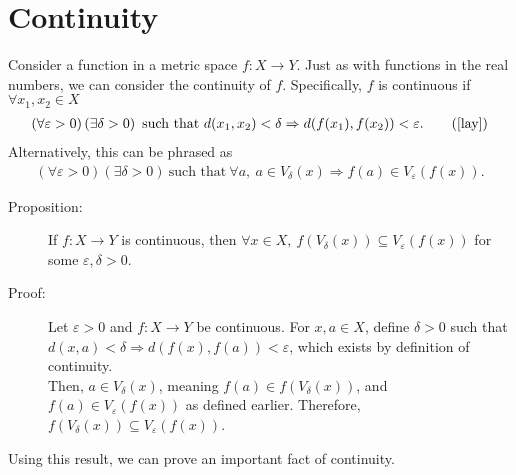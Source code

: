 \documentclass[12pt]{extarticle}
\begin{document}
  \section*{Continuity}%
  Consider a function in a metric space $f: X\rightarrow Y$. Just as with functions in the real numbers, we can consider the continuity of $f$. Specifically, $f$ is continuous if $\forall x_1,x_2\in X$
  \begin{align*}
    \left(\forall \varepsilon > 0\right)\left(\exists \delta > 0\right)~\text{such that}~d(x_1,x_2) < \delta \Rightarrow d(f(x_1),f(x_2))<\varepsilon. \tag*{(\cite{lay})}
  \end{align*}
  Alternatively, this can be phrased as
  \begin{align*}
    \left(\forall \varepsilon > 0\right)\left(\exists \delta > 0\right)~\text{such that}~\forall a,~a\in V_{\delta}(x) \Rightarrow f(a)\in V_{\varepsilon}(f(x)).
  \end{align*}
  \begin{description}
    \item[Proposition:] If $f:X\rightarrow Y$ is continuous, then $\forall x\in X,~f(V_{\delta}(x)) \subseteq V_{\varepsilon}(f(x))$ for some $\varepsilon,\delta > 0$.
    \item[Proof:] Let $\varepsilon > 0$ and $f: X\rightarrow Y$ be continuous. For $x,a\in X$, define $\delta > 0$ such that $d(x,a) < \delta \Rightarrow d(f(x),f(a)) < \varepsilon$, which exists by definition of continuity.\\

      Then, $a\in V_{\delta}(x)$, meaning $f(a)\in f(V_{\delta}(x))$, and $f(a)\in V_{\varepsilon}(f(x))$ as defined earlier. Therefore, $f(V_{\delta}(x))\subseteq V_{\varepsilon}(f(x))$.
  \end{description}
  Using this result, we can prove an important fact of continuity.
\end{document}
